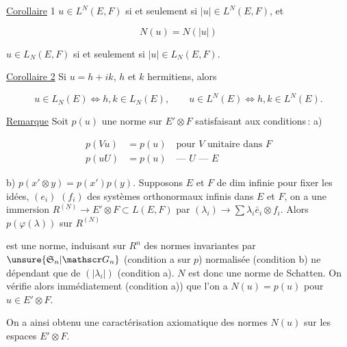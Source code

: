 
\uline{Corollaire} 1 $u\in L^N(E,F)$ si et seulement si $|u|\in L^N(E,F)$, et

\[
N(u)=N(|u|)
\]

$u\in L_N(E,F)$ si et seulement si $|u|\in L_N(E,F)$.


\uline{Corollaire 2} Si $u=h+ik$, $h$ et $k$ hermitiens, alors

\[
u\in L_N(E)\Longleftrightarrow h,k\in L_N(E),\qquad
u\in L^N(E)\Longleftrightarrow h,k\in L^N(E).
\]

\uline{Remarque} Soit $p(u)$ une norme sur $E'\otimes F$ satisfaisant aux conditions\,: a)

\[
\begin{aligned}
p(Vu)&=p(u)\quad\text{pour $V$ unitaire dans $F$}\\
p(uU)&=p(u)\quad\text{--- $U$ --- $E$}
\end{aligned}
\]

b) $p(x'\otimes y)=p(x')p(y)$. Supposons $E$ et $F$ de dim infinie pour fixer les idées,  $(e_i)$ $(f_i)$ des systèmes orthonormaux infinis dans $E$ et $F$, on a une immersion $R^{(\underline N)}\to E'\otimes F\subset L(E,F)$ par $(\lambda_i)\to\sum\lambda_i\bar e_i\otimes f_i$. Alors $p(\varphi(\lambda))$ sur $R^{(N)}$

est une norme, induisant sur $R^n$ des normes  invariantes par $\unsure{\mathfrak S_n|\mathscr G_n}$ (condition a sur $p$) normalisée (condition b) ne dépendant que de $(|\lambda_i|)$ (condition a).  $N$ est donc une norme de Schatten. On vérifie alors immédiatement (condition a)) que l'on a $N(u)=p(u)$ pour  $u\in E'\otimes F$.

On a ainsi obtenu une caractérisation axiomatique des normes $N(u)$ sur les espaces  $E'\otimes F$.
